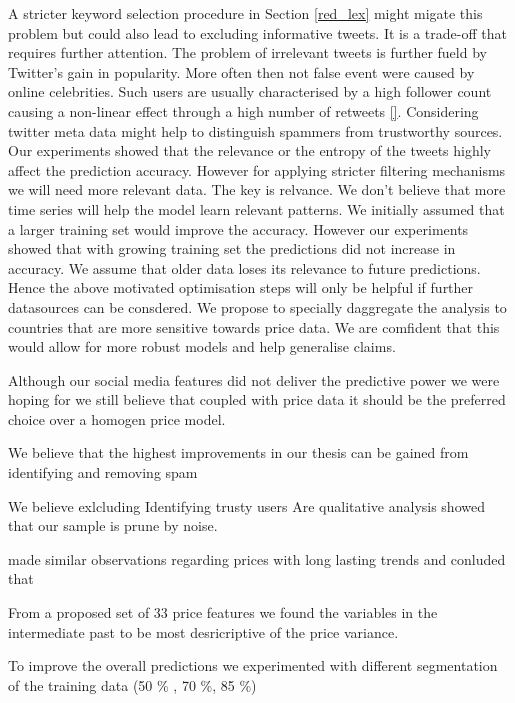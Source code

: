  A stricter keyword selection procedure in Section \ref{red_lex} might migate this problem but could also lead to excluding informative tweets. It is a trade-off that requires further attention. The problem of irrelevant tweets is further fueld by Twitter's gain in popularity. More often then not false event were caused by online celebrities. Such users are usually characterised by a high follower count causing a non-linear effect through a high number of retweets \ref{}. Considering twitter meta data might help to distinguish spammers from trustworthy sources. Our experiments showed that the relevance or the entropy of the tweets highly affect the prediction accuracy. However for applying stricter filtering mechanisms we will need more relevant data. The key is relvance. We don't believe that more time series will help the model learn relevant patterns. We initially assumed that a larger training set would improve the accuracy. However our experiments showed that with growing training set the predictions did not increase in accuracy. We assume that older data loses its relevance to future predictions. Hence the above motivated optimisation steps will only be helpful if further datasources can be consdered. We propose to specially daggregate the analysis to countries that are more sensitive towards price data. We are comfident that this would allow for more robust models and help generalise claims. 
 
Although our social media features did not deliver the predictive power we were hoping for we still believe that coupled with price data it should be the preferred choice over a homogen price model. 
 
 
 We believe that the
highest improvements in our thesis can be gained from identifying and removing spam


 We believe exlcluding Identifying trusty users
Are qualitative analysis showed that our sample is prune by noise. 

made similar observations regarding prices with long lasting trends and conluded that 


 From a proposed set of 33 price features we found the variables in the intermediate past to be most desricriptive of the price variance. 


To improve the overall predictions we experimented with different segmentation of the training data (50 \% , 70 \%, 85 \%) 









